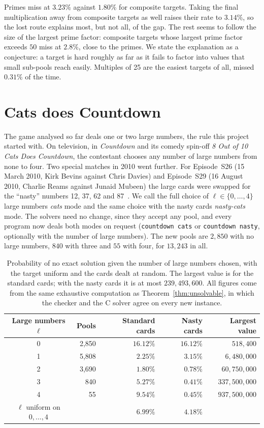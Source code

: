 \documentclass[11pt,a4paper]{article}
\theoremstyle{definition}
\theoremstyle{remark}
\begin{document}
Primes miss at $3.23\%$ against $1.80\%$ for composite targets. Taking the final multiplication away from
composite targets as well raises their rate to $3.14\%$, so the lost route explains most, but not all, of
the gap. The rest seems to follow the size of the largest prime factor: composite targets whose largest
prime factor exceeds $50$ miss at $2.8\%$, close to the primes. We state the explanation as a
conjecture: a target is hard roughly as far as it fails to factor into values that small sub-pools reach
easily. Multiples of 25 are the easiest targets of all, missed $0.31\%$ of the time.

\section{Cats does Countdown}\label{sec:cats}

The game analysed so far deals one or two large numbers, the rule this project started with. On television,
in \emph{Countdown} and its comedy spin-off \emph{8 Out of 10 Cats Does Countdown}, the contestant chooses
any number of large numbers from none to four. Two special matches in 2010 went further. For Episode~S26
(15 March 2010, Kirk Bevins against Chris Davies) and Episode~S29 (16 August 2010, Charlie Reams against
Junaid Mubeen) the large cards were swapped for the ``nasty'' numbers 12, 37, 62 and 87~\cite{apterous}.
We call the full choice of $\ell \in \{0, \dots, 4\}$ large numbers \emph{cats} mode and the same choice with
the nasty cards \emph{nasty-cats} mode. The solvers need no change, since they accept any pool, and every program now deals both modes on request (\texttt{countdown cats} or \texttt{countdown nasty}, optionally with the number of large numbers). The new pools are
$2{,}850$ with no large numbers, $840$ with three and $55$ with four, for $13{,}243$ in all.

\begin{table}[ht]
\centering
\small
\begin{tabular}{@{}crrrr@{}}
\toprule
Large numbers $\ell$ & Pools & Standard cards & Nasty cards & Largest value \\ \midrule
0 & 2{,}850 & $16.12\%$ & $16.12\%$ & $518{,}400$ \\
1 & 5{,}808 & $2.25\%$  & $3.15\%$  & $6{,}480{,}000$ \\
2 & 3{,}690 & $1.80\%$  & $0.78\%$  & $60{,}750{,}000$ \\
3 & 840     & $5.27\%$  & $0.41\%$  & $337{,}500{,}000$ \\
4 & 55      & $9.54\%$  & $0.45\%$  & $937{,}500{,}000$ \\ \midrule
$\ell$ uniform on $0, \dots, 4$ & & $6.99\%$ & $4.18\%$ & \\ \bottomrule
\end{tabular}
\caption{Probability of no exact solution given the number of large numbers chosen, with the target
uniform and the cards dealt at random. The largest value is for the standard cards; with the nasty cards it
is at most $239{,}493{,}600$. All figures come from the same exhaustive computation as
Theorem~\ref{thm:unsolvable}, in which the checker and the C solver agree on every new instance.}
\label{tab:cats}
\end{table}
\end{document}
